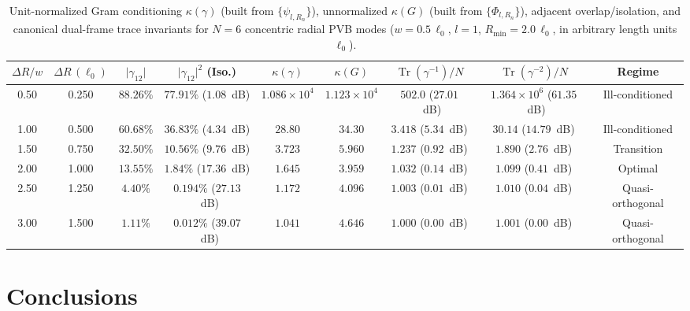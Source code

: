 \documentclass[aps,pra,onecolumn,notitlepage,11pt,tightenlines,nofootinbib,floatfix,longbibliography]{revtex4-2}
\theoremstyle{remark}
\newcommand{\abs}[1]{\lvert #1 \rvert}
\begin{document}
\begin{table}[t]
\caption{Unit-normalized Gram conditioning $\kappa(\gamma)$ (built from $\{\psi_{l,R_n}\}$), unnormalized $\kappa(G)$ (built from $\{\Phi_{l,R_n}\}$), adjacent overlap/isolation, and canonical dual-frame trace invariants for $N = 6$ concentric radial PVB modes ($w = 0.5\,\ell_0$, $l = 1$, $R_{\min} = 2.0\,\ell_0$, in arbitrary length units $\ell_0$).}
\label{tab:gram_matrix}
\begin{ruledtabular}
\scriptsize
\setlength{\tabcolsep}{2.5pt}
\begin{tabular}{ccccccccc}
$\Delta R / w$ & $\Delta R\,(\ell_0)$ & $\abs{\gamma_{12}}$ & $\abs{\gamma_{12}}^2$ (Iso.) & $\kappa(\gamma)$ & $\kappa(G)$ & $\operatorname{Tr}(\gamma^{-1})/N$ & $\operatorname{Tr}(\gamma^{-2})/N$ & Regime \\
\hline
0.50 & 0.250 & $88.26\%$ & $77.91\%$ ($1.08$~dB) & $1.086\times 10^4$ & $1.123\times 10^4$ & $502.0$ ($27.01$~dB) & $1.364\times 10^6$ ($61.35$~dB) & Ill-conditioned \\
1.00 & 0.500 & $60.68\%$ & $36.83\%$ ($4.34$~dB) & $28.80$ & $34.30$ & $3.418$ ($5.34$~dB) & $30.14$ ($14.79$~dB) & Ill-conditioned \\
1.50 & 0.750 & $32.50\%$ & $10.56\%$ ($9.76$~dB) & $3.723$ & $5.960$ & $1.237$ ($0.92$~dB) & $1.890$ ($2.76$~dB) & Transition \\
2.00 & 1.000 & $13.55\%$ & $1.84\%$ ($17.36$~dB) & $1.645$ & $3.959$ & $1.032$ ($0.14$~dB) & $1.099$ ($0.41$~dB) & Optimal \\
2.50 & 1.250 & $4.40\%$ & $0.194\%$ ($27.13$~dB) & $1.172$ & $4.096$ & $1.003$ ($0.01$~dB) & $1.010$ ($0.04$~dB) & Quasi-orthogonal \\
3.00 & 1.500 & $1.11\%$ & $0.012\%$ ($39.07$~dB) & $1.041$ & $4.646$ & $1.000$ ($0.00$~dB) & $1.001$ ($0.00$~dB) & Quasi-orthogonal \\
\end{tabular}
\end{ruledtabular}
\end{table}

\section{Conclusions}
\label{sec:conclusions}
\end{document}
